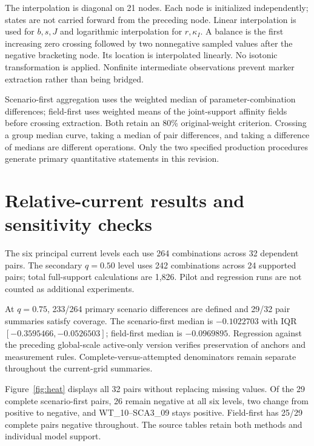 \documentclass[11pt,a4paper]{article}
\begin{document}
The interpolation is diagonal on 21 nodes. Each node is initialized independently; states are not carried forward from the preceding node. Linear interpolation is used for $b,s,J$ and logarithmic interpolation for $r,\kappa_I$. A balance is the first increasing zero crossing followed by two nonnegative sampled values after the negative bracketing node. Its location is interpolated linearly. No isotonic transformation is applied. Nonfinite intermediate observations prevent marker extraction rather than being bridged.

Scenario-first aggregation uses the weighted median of parameter-combination differences; field-first uses weighted means of the joint-support affinity fields before crossing extraction. Both retain an 80\% original-weight criterion. Crossing a group median curve, taking a median of pair differences, and taking a difference of medians are different operations. Only the two specified production procedures generate primary quantitative statements in this revision.

\section{Relative-current results and sensitivity checks}\label{s:qresults}
The six principal current levels each use 264 combinations across 32 dependent pairs. The secondary $q=0.50$ level uses 242 combinations across 24 supported pairs; total full-support calculations are 1,826. Pilot and regression runs are not counted as additional experiments.

At $q=0.75$, 233/264 primary scenario differences are defined and 29/32 pair summaries satisfy coverage. The scenario-first median is $-0.1022703$ with IQR $[-0.3595466,-0.0526503]$; field-first median is $-0.0969895$. Regression against the preceding global-scale active-only version verifies preservation of anchors and measurement rules. Complete-versus-attempted denominators remain separate throughout the current-grid summaries.

Figure~\ref{fig:heat} displays all 32 pairs without replacing missing values. Of the 29 complete scenario-first pairs, 26 remain negative at all six levels, two change from positive to negative, and WT\_10--SCA3\_09 stays positive. Field-first has 25/29 complete pairs negative throughout. The source tables retain both methods and individual model support.
\end{document}
